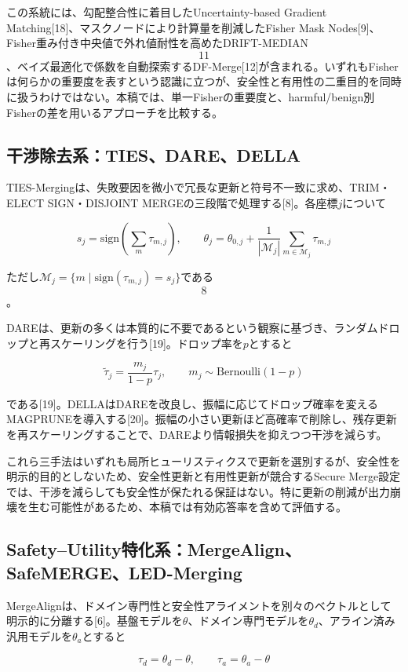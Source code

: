 \documentclass{article}
\begin{document}
この系統には、勾配整合性に着目したUncertainty-based Gradient Matching[18]、マスクノードにより計算量を削減したFisher Mask Nodes[9]、Fisher重み付き中央値で外れ値耐性を高めたDRIFT-MEDIAN\[11\]、ベイズ最適化で係数を自動探索するDF-Merge[12]が含まれる。いずれもFisherは何らかの重要度を表すという認識に立つが、安全性と有用性の二重目的を同時に扱うわけではない。本稿では、単一Fisherの重要度と、harmful/benign別Fisherの差を用いるアプローチを比較する。

\subsection{干渉除去系：TIES、DARE、DELLA}

TIES-Mergingは、失敗要因を微小で冗長な更新と符号不一致に求め、TRIM・ELECT SIGN・DISJOINT MERGEの三段階で処理する[8]。各座標\(j\)について

\[
s_j=\mathrm{sign}\left(\sum_m \tau_{m,j}\right),\qquad
\theta_j=\theta_{0,j}+\frac{1}{|\mathcal{M}_j|}\sum_{m\in\mathcal{M}_j}\tau_{m,j}
\tag{6}
\]

ただし\(\mathcal{M}_j=\{m\mid \mathrm{sign}(\tau_{m,j})=s_j\}\)である\[8\]。

DAREは、更新の多くは本質的に不要であるという観察に基づき、ランダムドロップと再スケーリングを行う[19]。ドロップ率を\(p\)とすると

\[
\tilde{\tau}_j=\frac{m_j}{1-p}\tau_j,\qquad m_j\sim\mathrm{Bernoulli}(1-p)
\tag{7}
\]

である[19]。DELLAはDAREを改良し、振幅に応じてドロップ確率を変えるMAGPRUNEを導入する[20]。振幅の小さい更新ほど高確率で削除し、残存更新を再スケーリングすることで、DAREより情報損失を抑えつつ干渉を減らす。

これら三手法はいずれも局所ヒューリスティクスで更新を選別するが、安全性を明示的目的としないため、安全性更新と有用性更新が競合するSecure Merge設定では、干渉を減らしても安全性が保たれる保証はない。特に更新の削減が出力崩壊を生む可能性があるため、本稿では有効応答率を含めて評価する。

\subsection{Safety–Utility特化系：MergeAlign、SafeMERGE、LED-Merging}

MergeAlignは、ドメイン専門性と安全性アライメントを別々のベクトルとして明示的に分離する[6]。基盤モデルを\(\theta\)、ドメイン専門モデルを\(\theta_d\)、アライン済み汎用モデルを\(\theta_a\)とすると

\[
\tau_d=\theta_d-\theta,\qquad \tau_a=\theta_a-\theta
\tag{8}
\]
\end{document}
